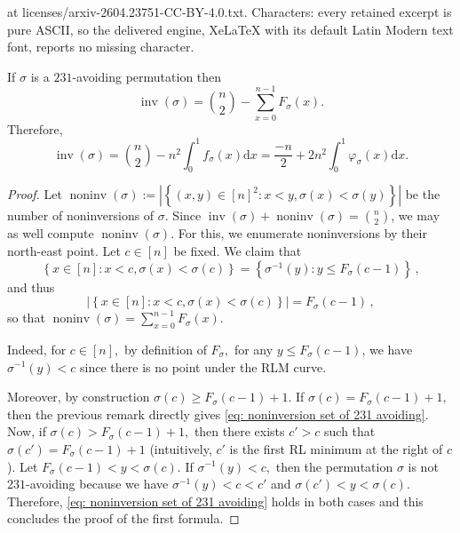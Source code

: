 \documentclass[10pt,a4paper]{amsart}
\newcommand{\card}[1]{\left|\left\{ #1 \right\}\right|}
\DeclareMathOperator{\inv}{inv}
\DeclareMathOperator{\noninv}{noninv}
\begin{document}
at licenses/arxiv-2604.23751-CC-BY-4.0.txt. Characters: every retained excerpt is pure ASCII, so the delivered engine, XeLaTeX with its default Latin Modern text font, reports no missing character.
\begin{prop}\label{prop: inv of 231 avoiding permutation}
    If $\sigma$ is a $231$-avoiding permutation then
    \[\inv(\sigma) = \binom{n}{2} - \sum_{x=0}^{n-1} F_\sigma(x).\]
    Therefore,
    \[ \inv(\sigma)
    = \binom{n}{2} - n^2 \int_0^1 f_\sigma(x) \mathrm{d}x 
    = \frac{-n}{2} + 2 n^2 \int_0^1 \varphi_\sigma(x) \mathrm{d}x  .\]
\end{prop}

\begin{proof}
 Let $\noninv(\sigma) := \card{ (x,y)\in[n]^2 : x<y , \sigma(x)<\sigma(y) }$ be the number of noninversions of $\sigma$.
    Since $\inv(\sigma) + \noninv(\sigma) = \binom{n}{2}$, we may as well compute $\noninv(\sigma)$.
    For this, we enumerate noninversions by their north-east point.
    Let $c\in[n]$ be fixed.
    We claim that 
    \begin{equation}\label{eq: noninversion set of 231 avoiding}
        \left\{ x\in[n] : x<c , \sigma(x)<\sigma(c) \right\}
        = \left\{ \sigma^{-1}(y) : y \le F_\sigma(c-1) \right\} \,,
    \end{equation}
    and thus
    \begin{equation*}\label{eq: noninversion count of 231 avoiding}
        \card{ x\in[n] : x<c , \sigma(x)<\sigma(c) }
        = F_\sigma(c-1) \,,
    \end{equation*}
    so that $\noninv(\sigma) =  \sum_{x=0}^{n-1} F_\sigma(x).$

Indeed, for $c\in [n],$ by definition of $F_\sigma,$ for any $y \le    F_\sigma(c-1)$, we have $\sigma^{-1}(y)<c $ since there is no point under the RLM curve.

Moreover, by construction $\sigma(c) \ge  F_\sigma(c-1) +1.$ If $ \sigma(c) =  F_\sigma(c-1) +1,$ then the previous remark directly gives \eqref{eq: noninversion set of 231 avoiding}. Now, if  $ \sigma(c) > F_\sigma(c-1) +1,$ then there exists $c'>c$ such that  $ \sigma(c') = F_\sigma(c-1) +1$ (intuitively, $c'$ is the first RL minimum at the right of $c$). Let $ F_\sigma(c-1)< y< \sigma(c).$
If $\sigma^{-1}(y) < c,$ then the permutation $\sigma$ is not $231$-avoiding because we have $\sigma^{-1}(y) < c < c'$ and
$\sigma(c')< y < \sigma(c).$ Therefore, \eqref{eq: noninversion set of 231 avoiding} holds in both cases and this concludes the proof of the first formula.


\end{proof}
\end{document}
